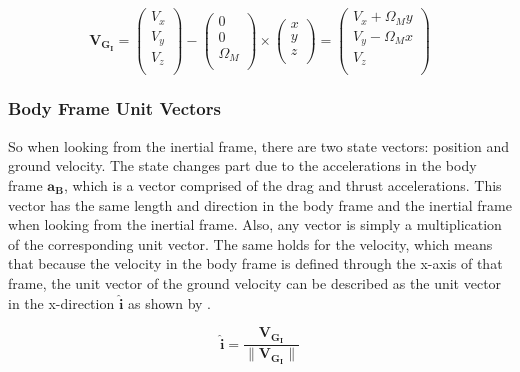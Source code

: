 \begin{equation} \label{eq:VGI}
\mathbf{V_{G_{I}}} = 
\begin{pmatrix}
V_{x}\\
V_{y}\\
V_{z}\\
\end{pmatrix}
-
\begin{pmatrix}
0 \\
0 \\
\Omega_{M} \\
\end{pmatrix}
\times
\begin{pmatrix}
x \\
y \\
z \\
\end{pmatrix}=
\begin{pmatrix}
V_{x}+\Omega_{M}y \\
V_{y}-\Omega_{M}x \\
V_{z} \\
\end{pmatrix}
\end{equation}

\subsubsection{Body Frame Unit Vectors}
So when looking from the inertial frame, there are two state vectors: position and ground velocity. The state changes part due to the accelerations in the body frame $\mathbf{a_{B}}$, which is a vector comprised of the drag and thrust accelerations. This vector has the same length and direction in the body frame and the inertial frame when looking from the inertial frame. Also, any vector is simply a multiplication of the corresponding unit vector. The same holds for the velocity, which means that because the velocity in the body frame is defined through the x-axis of that frame, the unit vector of the ground velocity can be described as the unit vector in the x-direction $\mathbf{\hat{i}}$ as shown by .

\begin{equation} \label{eq:iHat}
\mathbf{\hat{i}} = \dfrac{\mathbf{V_{G_{I}}}}{\| \mathbf{V_{G_{I}}}\|}
\end{equation}


